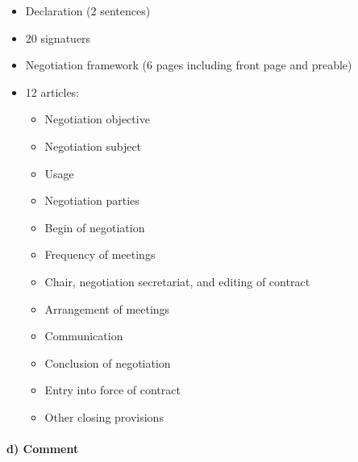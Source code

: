 \begin{itemize}
    \item Declaration (2 sentences)
    \item 20 signatuers
    \item Negotiation framework (6 pages including front page and preable)
    \item 12 articles:
        \begin{itemize}
            \item Negotiation objective
            \item Negotiation subject
            \item Usage
            \item Negotiation parties
            \item Begin of negotiation
            \item Frequency of meetings
            \item Chair, negotiation secretariat, and editing of contract
            \item Arrangement of meetings
            \item Communication
            \item Conclusion of negotiation
            \item Entry into force of contract
            \item Other closing provisions
        \end{itemize}
\end{itemize}

\paragraph{d) Comment}

